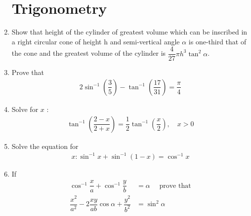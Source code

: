\documentclass[12pt,-letter paper]{article}
\theoremstyle{remark}
\providecommand{\brak}[1]{\ensuremath{\left(#1\right)}}
\begin{document}
\begin{enumerate}
            \section{Trigonometry}
      \item Show that height of the cylinder of greatest volume which can be inscribed in a right circular cone of height h and semi-vertical angle $\alpha$ is one-third that of the cone and the greatest volume of the cylinder is $\dfrac{4}{27} \pi h^3 \tan^2 \alpha$.
      \item Prove that
            \begin{align*}
                  2\sin^{-1}\brak{\dfrac{3}{5}}-\tan^{-1}\brak{\dfrac{17}{31}}=\dfrac{\pi}{4}
            \end{align*}
      \item Solve for $x$ :
            \begin{align*}
                  \tan^{-1}\brak{\dfrac{2-x}{2+x}}=\dfrac{1}{2} \tan^{-1}\brak{\dfrac{x}{2}},\quad x>0
            \end{align*}

      \item Solve the equation for
            \begin{align*}
                  x: \sin^{-1} x + \sin^{-1}\brak{1-x} = \cos^{-1}x
            \end{align*}
      \item If
            \begin{align*}
                  \cos^{-1}\dfrac{x}{a} + \cos^{-1}\dfrac{y}{b}                   & = \alpha \quad \text{ prove that} \\
                  \dfrac{x^2}{a^2} -2\dfrac{xy}{ab}\cos \alpha + \dfrac{y^2}{b^2} & = \sin^2 \alpha
            \end{align*}

\end{enumerate}
\end{document}
